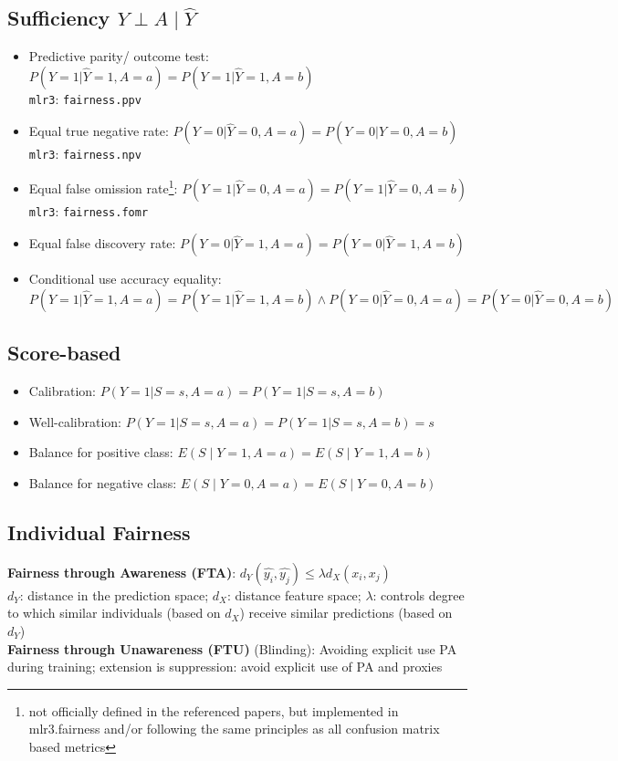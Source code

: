 \documentclass[11pt,a4paper]{article}
\begin{document}
\subsection*{Sufficiency $Y \perp A \mid \hat{Y}$}
\begin{itemize}[leftmargin=2em]
    \item Predictive parity/ outcome test: $P(Y = 1 | \hat{Y} = 1, A = a) = P(Y = 1 | \hat{Y} = 1, A = b)$ \\ \texttt{mlr3}: \texttt{fairness.ppv}
    \item Equal true negative rate: $P(Y = 0 | \hat{Y} = 0, A = a) = P(Y = 0 | \hat{Y} = 0, A = b)$ \\ \texttt{mlr3}: \texttt{fairness.npv}
    \item Equal false omission rate\footnote{not officially defined in the referenced papers, but implemented in mlr3.fairness and/or following the same principles as all confusion matrix based metrics}\label{fn:confusion_metrics}: $P(Y = 1 | \hat{Y} = 0, A = a) = P(Y = 1 | \hat{Y} = 0, A = b)$ \\ \texttt{mlr3}: \texttt{fairness.fomr}
    \item Equal false discovery rate: $P(Y = 0 | \hat{Y} = 1, A = a) = P(Y = 0 | \hat{Y} = 1, A = b)$ 
    \item Conditional use accuracy equality: $P(Y = 1 | \hat{Y} = 1, A = a) = P(Y = 1 | \hat{Y} = 1, A = b) \land P(Y = 0 | \hat{Y} = 0, A = a) = P(Y = 0 | \hat{Y} = 0, A = b)$
\end{itemize}

\subsection*{Score-based}
\begin{itemize}
    \item Calibration: $P(Y = 1 | S = s, A = a) = P(Y = 1 | S = s, A = b)$
    \item Well-calibration: $P(Y = 1 | S = s, A = a) = P(Y = 1 | S = s, A = b) = s$
    \item Balance for positive class: $E(S \mid Y = 1, A = a) = E(S \mid Y = 1, A = b)$
    \item Balance for negative class: $E(S \mid Y = 0, A = a) = E(S \mid Y = 0, A = b)$
\end{itemize}

\subsection*{Individual Fairness}
\textbf{Fairness through Awareness (FTA)}: 
$d_Y(\hat{y_i}, \hat{y_j}) \leq \lambda d_X(x_i, x_j)$ \\
$d_Y$: distance in the prediction space; $d_X$: distance feature space; $\lambda$: controls degree to which similar individuals (based on $d_X$) receive similar predictions (based on $d_Y$)\\
\noindent
\textbf{Fairness through Unawareness (FTU)} (Blinding): 
Avoiding explicit use PA during training; extension is suppression: avoid explicit use of PA and proxies
\end{document}
